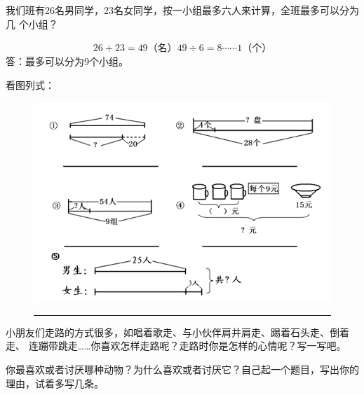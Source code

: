 \documentclass[a4paper, answer, zihao = -4, unicodeGBMath, fontset=sourcesans, %
]{ctexart}
\begin{document}
\begin{qus}
  \item 我们班有26名男同学，23名女同学，按一小组最多六人来计算，全班最多可以分为几
    个小组？
    \begin{solution}[3cm]
      \begin{align*}
        26 + 23 = 49\text{（名）}
        49 \div 6 = 8 \cdots \cdots 1 \text{（个）}
      \end{align*}
      答：最多可以分为9个小组。
    \end{solution}

  \item 看图列式：
    \begin{figure}[ht]
      \centering
      \includegraphics[width = 0.9\linewidth]{shuxue}

      \rule[-2mm]{5cm}{2pt}\hspace*{2cm}
    \end{figure}

  \item 小朋友们走路的方式很多，如唱着歌走、与小伙伴肩并肩走、踢着石头走、倒着走、
    连蹦带跳走……你喜欢怎样走路呢？走路时你是怎样的心情呢？写一写吧。
    \begin{solution}[4cm]
      
    \end{solution}
    
\end{qus}
\clearpage


\begin{qus}

\item 你最喜欢或者讨厌哪种动物？为什么喜欢或者讨厌它？自己起一个题目，写出你的理由，试着多写几条。
  

\end{qus}
\end{document}
